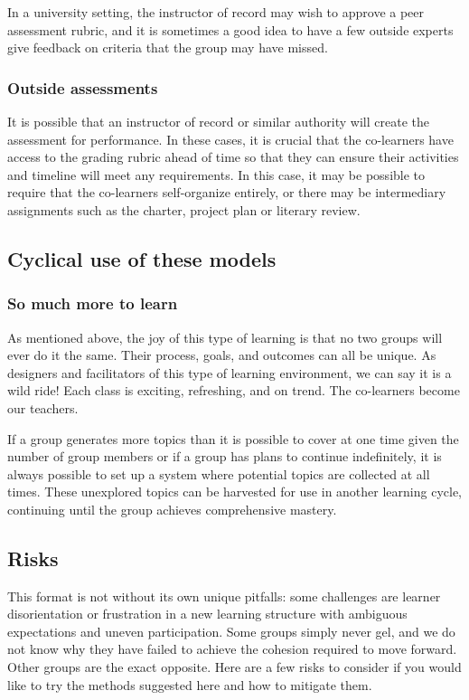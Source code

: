 In a university setting, the instructor of record may wish to approve a
peer assessment rubric, and it is sometimes a good idea to have a few
outside experts give feedback on criteria that the group may have
missed.

\subsubsection{Outside assessments}

It is possible that an instructor of record or similar authority will
create the assessment for performance. In these cases, it is crucial
that the co-learners have access to the grading rubric ahead of time so
that they can ensure their activities and timeline will meet any
requirements. In this case, it may be possible to require that the
co-learners self-organize entirely, or there may be intermediary
assignments such as the charter, project plan or literary review.

\subsection{Cyclical use of these models}

\subsubsection{So much more to learn}

As mentioned above, the joy of this type of learning is that no two
groups will ever do it the same. Their process, goals, and outcomes can
all be unique. As designers and facilitators of this type of learning
environment, we can say it is a wild ride! Each class is exciting,
refreshing, and on trend. The co-learners become our teachers.

If a group generates more topics than it is possible to cover at one
time given the number of group members or if a group has plans to
continue indefinitely, it is always possible to set up a system where
potential topics are collected at all times. These unexplored topics can
be harvested for use in another learning cycle, continuing until the
group achieves comprehensive mastery.

\subsection{Risks}

This format is not without its own unique pitfalls: some challenges are
learner disorientation or frustration in a new learning structure with
ambiguous expectations and uneven participation. Some groups simply
never gel, and we do not know why they have failed to achieve the
cohesion required to move forward. Other groups are the exact opposite.
Here are a few risks to consider if you would like to try the methods
suggested here and how to mitigate them.

